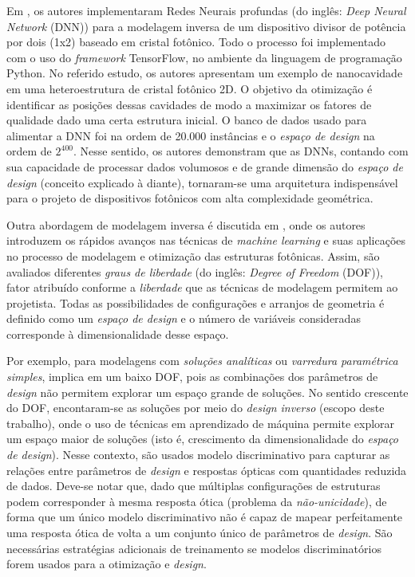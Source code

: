 Em \cite{tahersima2019deep}, os autores implementaram Redes Neurais profundas (do inglês: \textit{Deep Neural Network} (DNN)) para a modelagem inversa de um dispositivo divisor de potência por dois (1x2) baseado em cristal fotônico. Todo o processo foi implementado com o uso do \textit{framework} TensorFlow, no ambiente da linguagem de programação Python. No referido estudo, os autores apresentam um exemplo de nanocavidade em uma heteroestrutura de cristal fotônico 2D. O objetivo da otimização é identificar as posições dessas cavidades de modo a maximizar os fatores de qualidade dado uma certa estrutura inicial. O banco de dados usado para alimentar a DNN foi na ordem de 20.000 instâncias e o \textit{espaço de design} na ordem de $2^{400}$. Nesse sentido, os autores demonstram que as DNNs, contando com sua capacidade de processar dados volumosos e de grande dimensão do \textit{espaço de design} (conceito explicado à diante), tornaram-se uma arquitetura indispensável para o projeto de dispositivos fotônicos com alta complexidade geométrica.

Outra abordagem de modelagem inversa é discutida em \cite{liu2021tackling}, onde os autores introduzem os rápidos avanços nas técnicas de \textit{machine learning} e suas aplicações no processo de modelagem e otimização das estruturas fotônicas. Assim, são avaliados diferentes \textit{graus de liberdade} (do inglês: \textit{Degree of Freedom} (DOF)), fator atribuído conforme a \textit{liberdade} que as técnicas de modelagem permitem ao projetista. Todas as possibilidades de configurações e arranjos de geometria é definido como um \textit{espaço de design} e o número de variáveis consideradas corresponde à dimensionalidade desse espaço.

Por exemplo, para modelagens com \textit{soluções analíticas} ou \textit{varredura paramétrica simples}, implica em um baixo DOF, pois as combinações dos parâmetros de \textit{design} não permitem explorar um espaço grande de soluções. No sentido crescente do DOF, encontaram-se as soluções por meio do \textit{design inverso} (escopo deste trabalho), onde o uso de técnicas em aprendizado de máquina permite explorar um espaço maior de soluções (isto é, crescimento da dimensionalidade do \textit{espaço de design}). Nesse contexto, são usados modelo discriminativo para capturar as relações entre parâmetros de \textit{design} e respostas ópticas com quantidades reduzida de dados. Deve-se notar que, dado que múltiplas configurações de estruturas podem corresponder à mesma resposta ótica (problema da \textit{não-unicidade}), de forma que um único modelo discriminativo não é capaz de mapear perfeitamente uma resposta ótica de volta a um conjunto único de parâmetros de \textit{design}. São necessárias estratégias adicionais de treinamento se modelos discriminatórios forem usados para a otimização e \textit{design}.


